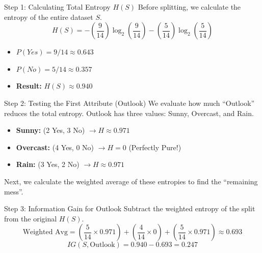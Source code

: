 \documentclass[aspectratio=169]{beamer}
\begin{document}
\begin{frame}{Step 1: Calculating Total Entropy $H(S)$}
    Before splitting, we calculate the entropy of the entire dataset $S$.
    \[ H(S) = -\left(\frac{9}{14}\right) \log_2 \left(\frac{9}{14}\right) - \left(\frac{5}{14}\right) \log_2 \left(\frac{5}{14}\right) \]
    \vfill
    \begin{itemize}
        \item $P(Yes) = 9/14 \approx 0.643$
        \item $P(No) = 5/14 \approx 0.357$
        \item \textbf{Result:} $H(S) \approx 0.940$
    \end{itemize}
\end{frame}

\begin{frame}{Step 2: Testing the First Attribute (Outlook)}
    We evaluate how much ``Outlook'' reduces the total entropy. Outlook has three values: Sunny, Overcast, and Rain.
    \begin{itemize}
        \item \textbf{Sunny:} (2 Yes, 3 No) $\rightarrow H \approx 0.971$
        \item \textbf{Overcast:} (4 Yes, 0 No) $\rightarrow H = 0$ (Perfectly Pure!)
        \item \textbf{Rain:} (3 Yes, 2 No) $\rightarrow H \approx 0.971$
    \end{itemize}
    \vfill
    Next, we calculate the weighted average of these entropies to find the ``remaining mess''.
\end{frame}

\begin{frame}{Step 3: Information Gain for Outlook}
    Subtract the weighted entropy of the split from the original $H(S)$.
    \vfill
    \[ \text{Weighted Avg} = \left(\frac{5}{14} \times 0.971\right) + \left(\frac{4}{14} \times 0\right) + \left(\frac{5}{14} \times 0.971\right) \approx 0.693 \]
    \vfill
    \[ IG(S, \text{Outlook}) = 0.940 - 0.693 = \mathbf{0.247} \]
\end{frame}
\end{document}

